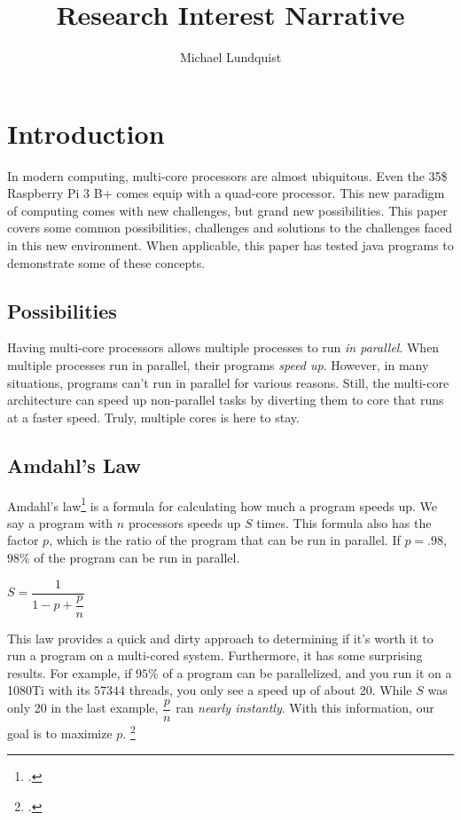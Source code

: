 \documentclass[titlepage]{article}
\author{Michael Lundquist}
\title{Research Interest Narrative}
\begin{document}
\maketitle


\section{Introduction}

In modern computing, multi-core processors are almost ubiquitous. Even the 35\$ Raspberry Pi 3 B+ comes equip with a quad-core processor. This new paradigm of computing comes with new challenges, but grand new possibilities. This paper covers some common possibilities, challenges and solutions to the challenges faced in this new environment. When applicable, this paper has tested java programs to demonstrate some of these concepts.

\subsection{Possibilities}

Having multi-core processors allows multiple processes to run \textit{in parallel}. When multiple processes run in parallel, their programs \textit{speed up}. However, in many situations, programs can't run in parallel for various reasons. Still, the multi-core architecture can speed up non-parallel tasks by diverting them to core that runs at a faster speed. Truly, multiple cores is here to stay.

\subsection{Amdahl's Law}

Amdahl's law\footcite[the cited paper is the law's origin]{Amdahl:1967:VSP:1465482.1465560} is a formula for calculating how much a program speeds up. We say a program with $n$ processors speeds up $S$ times. This formula also has the factor $p$, which is the ratio of the program that can be run in parallel. If $p =.98$, $98\%$ of the program can be run in parallel.

$S = \dfrac 1 {1 - p + \dfrac p n}$

This law provides a quick and dirty approach to determining if it's worth it to run a program on a multi-cored system. Furthermore, it has some surprising results. For example, if $95\%$ of a program can be parallelized, and you run it on a 1080Ti with its $57344$ threads, you only see a speed up of about 20. While $S$ was only 20 in the last example, $\dfrac p n$ ran \textit{nearly instantly}. With this information, our goal is to maximize $p$. \footcite[Stackoverflow user, djna, helps another user, Monster, maximize $p$]{stack:xxx}
\end{document}
